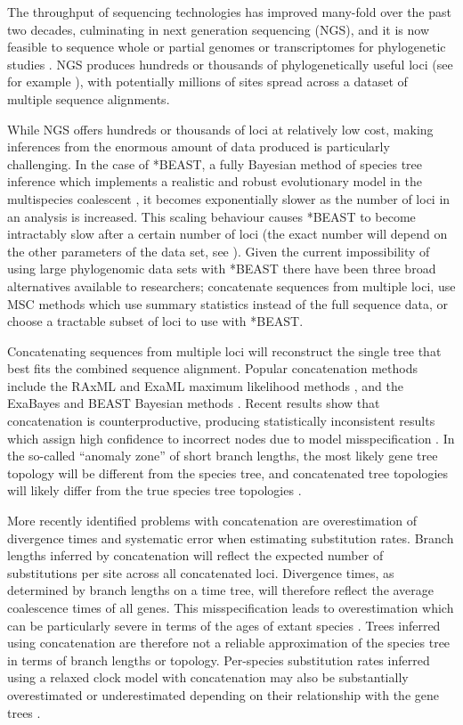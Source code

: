 \documentclass[12pt]{article}
\begin{document}
The throughput of sequencing technologies has improved many-fold over the past
two decades, culminating in next generation sequencing (NGS), and it is now
feasible to sequence whole or partial genomes or transcriptomes for phylogenetic
studies \citep{annurev-ecolsys-110512-135822}. NGS produces hundreds or
thousands of phylogenetically useful loci (see for example \cite{Blom056085}),
with potentially millions of sites spread across a dataset of multiple
sequence alignments.

While NGS offers hundreds or thousands of loci at relatively low cost, making
inferences from the enormous amount of data produced is particularly
challenging. In the case of *BEAST, a fully Bayesian method of species tree
inference which implements a realistic and robust evolutionary model in the
multispecies coalescent \citep[MSC;][]{Degnan2009332}, it becomes exponentially
slower as the number of loci in an analysis is increased. This scaling behaviour
causes *BEAST to become intractably slow after a certain number of loci (the
exact number will depend on the other parameters of the data set, see
\cite{Ogilvie01052016}). Given the current impossibility of using large
phylogenomic data sets with *BEAST there have been three broad alternatives
available to researchers; concatenate sequences from multiple loci, use MSC
methods which use summary statistics instead of the full sequence data, or
choose a tractable subset of loci to use with *BEAST.

Concatenating sequences from multiple loci will reconstruct the single tree that
best fits the combined sequence alignment. Popular concatenation methods include
the RAxML and ExaML maximum likelihood methods \citep{Stamatakis01052014,
Kozlov01082015}, and the ExaBayes and BEAST Bayesian methods
\citep{Aberer01102014, Drummond2007}. Recent results show that concatenation
is counterproductive, producing statistically inconsistent results which assign
high confidence to incorrect nodes due to model misspecification
\citep{NYAS:NYAS12747}. In the so-called ``anomaly zone'' of short branch
lengths, the most likely gene tree topology will be different from the species
tree, and concatenated tree topologies will likely differ from the true species
tree topologies \citep{journal.pgen.0020068, Kubatko01022007}.

More recently identified problems with concatenation are overestimation of
divergence times and systematic error when estimating substitution rates. Branch lengths
inferred by concatenation will reflect the expected number of substitutions per
site across all concatenated loci. Divergence times, as determined by branch
lengths on a time tree, will therefore reflect the average coalescence times of
all genes. This misspecification leads to overestimation which can be
particularly severe in terms of the ages of extant species
\citep{Ogilvie01052016}. Trees inferred using concatenation are therefore not a
reliable approximation of the species tree in terms of branch lengths or
topology. Per-species substitution rates inferred using a relaxed clock model
with concatenation may also be substantially overestimated or underestimated
depending on their relationship with the gene trees \citep{Mendes28022016}.
\end{document}
